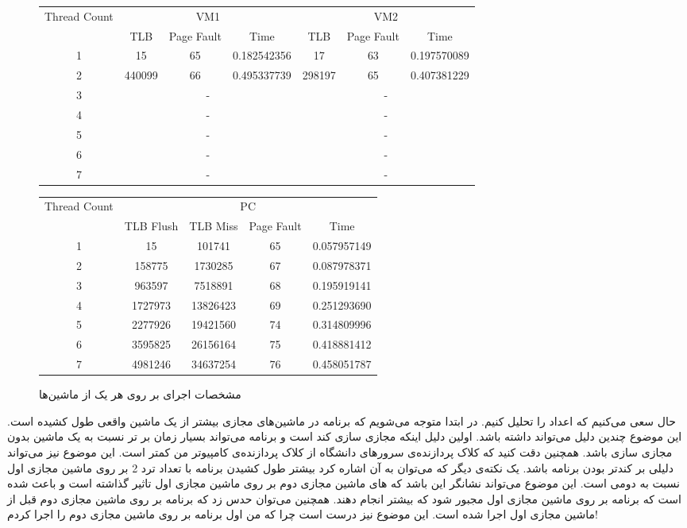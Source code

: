 \begin{figure}[H]
\small
\centering
\begin{latin}
\begin{tabular}{|c|ccc|ccc|}
    \hline
    \multirow{2}{*}{Thread Count} & \multicolumn{3}{|c|}{VM1} & \multicolumn{3}{|c|}{VM2}\\
    & TLB & Page Fault & Time & TLB & Page Fault & Time\\
    \hline
    1 & 15&65&0.182542356 & 17&63&0.197570089\\
    2 & 440099&66&0.495337739 & 298197&65&0.407381229\\
    3 & \multicolumn{3}{|c|}{-} & \multicolumn{3}{|c|}{-}\\
    4 & \multicolumn{3}{|c|}{-} & \multicolumn{3}{|c|}{-}\\
    5 & \multicolumn{3}{|c|}{-} & \multicolumn{3}{|c|}{-}\\
    6 & \multicolumn{3}{|c|}{-} & \multicolumn{3}{|c|}{-}\\
    7 & \multicolumn{3}{|c|}{-} & \multicolumn{3}{|c|}{-}\\
    \hline
\end{tabular}
\begin{tabular}{|c|cccc|}
    \hline
    \multirow{2}{*}{Thread Count} & \multicolumn{4}{|c|}{PC}\\
    & TLB Flush & TLB Miss & Page Fault & Time\\
    \hline
    1&15&101741&65&0.057957149\\
    2&158775&1730285&67&0.087978371\\
    3&963597&7518891&68&0.195919141\\
    4&1727973&13826423&69&0.251293690\\
    5&2277926&19421560&74&0.314809996\\
    6&3595825&26156164&75&0.418881412\\
    7&4981246&34637254&76&0.458051787\\
    \hline
\end{tabular}
\end{latin}
\caption{مشخصات اجرای بر روی هر یک از ماشین‌ها}
\end{figure}
حال سعی می‌کنیم که اعداد را تحلیل کنیم. در ابتدا متوجه می‌شویم که برنامه در ماشین‌های مجازی بیشتر از
یک ماشین واقعی طول کشیده است. این موضوع چندین دلیل می‌تواند داشته باشد. اولین دلیل اینکه مجازی سازی کند
است و
برنامه می‌تواند بسیار زمان بر تر نسبت به یک ماشین بدون مجازی سازی باشد. همچنین دقت کنید که کلاک پردازنده‌ی
سرور‌های دانشگاه از کلاک پردازنده‌ی کامپیوتر من کمتر است. این موضوع نیز می‌تواند دلیلی بر کندتر
بودن برنامه باشد. یک نکته‌ی دیگر که می‌توان به آن اشاره کرد بیشتر طول کشیدن برنامه با تعداد ترد 2
بر روی ماشین مجازی اول نسبت به دومی است. این موضوع می‌تواند نشانگر این باشد که
های
ماشین مجازی دوم بر روی ماشین مجازی اول تاثیر گذاشته است و باعث شده است که برنامه‌ بر روی ماشین
مجازی اول مجبور شود که بیشتر 
انجام دهند. همچنین می‌توان حدس زد که برنامه‌ بر روی ماشین مجازی دوم قبل از ماشین مجازی اول اجرا
شده است. این موضوع نیز درست است چرا که من اول برنامه بر روی ماشین مجازی دوم را اجرا کردم!

